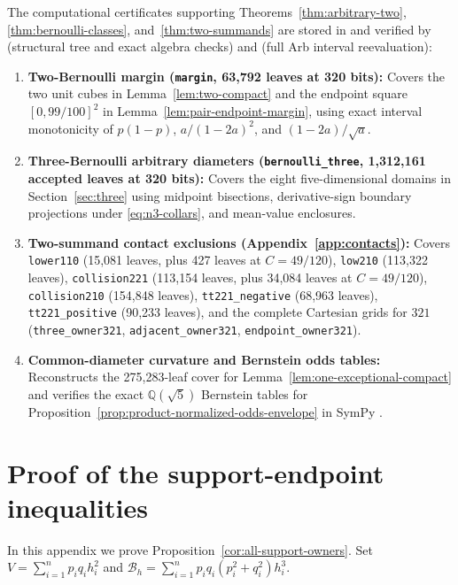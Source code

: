 \documentclass[11pt]{article}
\numberwithin{equation}{section}
\theoremstyle{definition}
\theoremstyle{remark}
\begin{document}
The computational certificates supporting Theorems~\ref{thm:arbitrary-two},
\ref{thm:bernoulli-classes}, and~\ref{thm:two-summands} are stored in
 and verified by 
(structural tree and exact algebra checks) and
 (full Arb interval
reevaluation):
\begin{enumerate}[label=(\arabic*),leftmargin=2em]
\item \textbf{Two-Bernoulli margin (\texttt{margin}, 63,792 leaves at 320 bits):}
Covers the two unit cubes in Lemma~\ref{lem:two-compact} and the endpoint
square $[0,99/100]^2$ in Lemma~\ref{lem:pair-endpoint-margin}, using exact
interval monotonicity of $p(1-p)$, $a/(1-2a)^2$, and $(1-2a)/\sqrt a$.
\item \textbf{Three-Bernoulli arbitrary diameters (\texttt{bernoulli\_three},
1,312,161 accepted leaves at 320 bits):} Covers the eight five-dimensional
domains in Section~\ref{sec:three} using midpoint bisections, derivative-sign
boundary projections under \eqref{eq:n3-collars}, and mean-value enclosures.
\item \textbf{Two-summand contact exclusions (Appendix~\ref{app:contacts}):}
Covers \texttt{lower110} (15,081 leaves, plus 427 leaves at $C=49/120$),
\texttt{low210} (113,322 leaves), \texttt{collision221} (113,154 leaves, plus
34,084 leaves at $C=49/120$), \texttt{collision210} (154,848 leaves),
\texttt{tt221\_negative} (68,963 leaves), \texttt{tt221\_positive} (90,233
leaves), and the complete Cartesian grids for $321$ (\texttt{three\_owner321},
\texttt{adjacent\_owner321}, \texttt{endpoint\_owner321}).
\item \textbf{Common-diameter curvature and Bernstein odds tables:}
Reconstructs the 275,283-leaf cover for Lemma~\ref{lem:one-exceptional-compact}
and verifies the exact $\mathbb Q(\sqrt5)$ Bernstein tables for
Proposition~\ref{prop:product-normalized-odds-envelope} in SymPy \citep{Meurer2017}.
\end{enumerate}

\appendix
\section{Proof of the support-endpoint inequalities}\label{app:support}

In this appendix we prove Proposition~\ref{cor:all-support-owners}. Set
$V=\sum_{i=1}^n p_iq_ih_i^2$ and $\mathcal B_h=\sum_{i=1}^n p_iq_i(p_i^2+q_i^2)h_i^3$.
\end{document}
